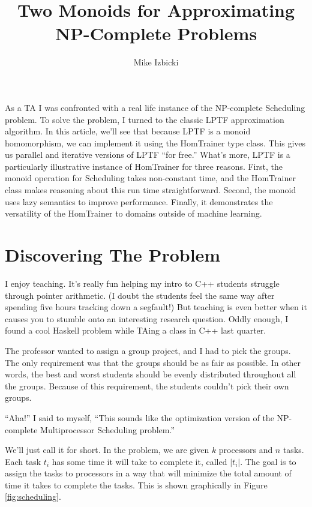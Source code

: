 \documentclass[tikz]{tmr}
\title{Two Monoids for Approximating NP-Complete Problems}
\author{Mike Izbicki\email{mike@izbicki.me}}
\newcommand{\prob}[1]{{\sc {#1}}}
\newcommand\+{\mdoubleplus}
\begin{document}
\begin{introduction}
As a TA I was confronted with a real life instance of the NP-complete Scheduling problem.
To solve the problem, I turned to the classic LPTF approximation algorithm.
In this article, we'll see that because LPTF is a monoid homomorphism, we can implement it using the HomTrainer  type class.
This gives us parallel and iterative versions of LPTF ``for free.''
What's more, LPTF is a particularly illustrative instance of HomTrainer for three reasons.
First, the monoid operation for Scheduling takes non-constant time, and the HomTrainer class makes reasoning about this run time straightforward.
Second, the monoid uses lazy semantics to improve performance.  
Finally, it demonstrates the versatility of the HomTrainer to domains outside of machine learning.
\end{introduction}

\section{Discovering The Problem}
I enjoy teaching.  
It's really fun helping my intro to C++ students struggle through pointer arithmetic.  
(I doubt the students feel the same way after spending five hours tracking down a segfault!)
But teaching is even better when it causes you to stumble onto an interesting research question.  
Oddly enough, I found a cool Haskell problem while TAing a class in C++ last quarter.

The professor wanted to assign a group project, and I had to pick the groups.
The only requirement was that the groups should be as fair as possible.
In other words, the best and worst students should be evenly distributed throughout all the groups.
Because of this requirement, the students couldn't pick their own groups.

``Aha!'' I said to myself, ``This sounds like the optimization version of the NP-complete Multiprocessor Scheduling problem.''  

We'll just call it \prob{Scheduling} for short.  
In the \prob{Scheduling} problem, we are given $k$ processors and $n$ tasks.
Each task $t_i$ has some time it will take to complete it, called $\lvert t_i \rvert$.
The goal is to assign the tasks to processors in a way that will minimize the total amount of time it takes to complete the tasks.
This is shown graphically in Figure \ref{fig:scheduling}.
\end{document}
